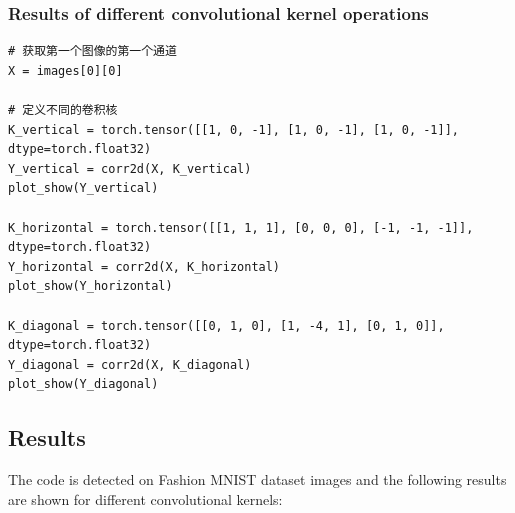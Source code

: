 \documentclass[a4paper,12pt]{article}
\begin{document}
\subsubsection{Results of different convolutional kernel operations}
\begin{lstlisting}
# 获取第一个图像的第一个通道
X = images[0][0]

# 定义不同的卷积核
K_vertical = torch.tensor([[1, 0, -1], [1, 0, -1], [1, 0, -1]], dtype=torch.float32)
Y_vertical = corr2d(X, K_vertical)
plot_show(Y_vertical)

K_horizontal = torch.tensor([[1, 1, 1], [0, 0, 0], [-1, -1, -1]], dtype=torch.float32)
Y_horizontal = corr2d(X, K_horizontal)
plot_show(Y_horizontal)

K_diagonal = torch.tensor([[0, 1, 0], [1, -4, 1], [0, 1, 0]], dtype=torch.float32)
Y_diagonal = corr2d(X, K_diagonal)
plot_show(Y_diagonal)
\end{lstlisting}

\subsection{Results}
The code is detected on Fashion MNIST dataset images and the following results are shown for different convolutional kernels:
\end{document}
